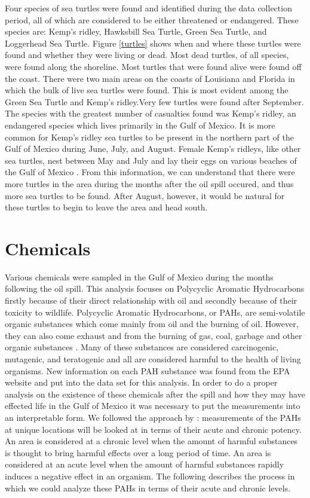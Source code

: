\documentclass[authoryear,12pt]{elsarticle}
\begin{document}
Four species of sea turtles were found and identified during the data collection period, all of which are considered to be either threatened or endangered. These species are: Kemp's ridley, Hawksbill Sea Turtle, Green Sea Turtle, and Loggerhead Sea Turtle. Figure \ref{turtles} shows when and where these turtles were found and whether they were living or dead. Most dead turtles, of all species, were found along the shoreline. Most turtles that were found alive were found off the coast. There were two main areas on the coasts of Louisiana and Florida in which the bulk of live sea turtles were found.  This is most evident among the Green Sea Turtle and Kemp's ridley.Very few turtles were found after September. The species with the greatest number of casualties found was Kemp's ridley, an endangered species which lives primarily in the Gulf of Mexico.  It is more common for Kemp's ridley sea turtles to be present in the northern part of the Gulf of Mexico during June, July, and August. Female Kemp's ridleys, like other sea turtles, nest between May and July and lay their eggs on various beaches of the Gulf of Mexico  \citet{turtles}. From this information, we can understand that there were more turtles in the area during the months after the oil spill occured, and thus more sea turtles to be found.  After August, however, it would be natural for these turtles to begin to leave the area and head south.

\section{Chemicals}


Various chemicals were sampled in the Gulf of Mexico during the months following the oil spill. This analysis focuses on Polycyclic Aromatic Hydrocarbons firstly because of their direct relationship with oil and secondly because of their toxicity to wildlife. Polycyclic Aromatic Hydrocarbons, or PAHs, are semi-volatile organic substances which come mainly from oil and the burning of oil. However, they can also come exhaust and from the burning of gas, coal, garbage and other organic substances \citep{pah}.   Many of these substances are considered carcinogenic, mutagenic, and teratogenic and all are considered harmful to the health of living organisms. New information on each PAH substance was found from the EPA website  \citep{pah} and put into the data set for this analysis. In order to do a proper analysis on the existence of these chemicals after the spill and how they may have effected life in the Gulf of Mexico it was necessary to put the measurements into an interpretable form. We followed the approach by \citet{pah-benchmark}: measurements of the PAHs at unique locations will be looked at in terms of their acute and chronic potency. An area is considered at a chronic level when the amount of harmful substances is thought to bring harmful effects over a long period of time. An area is considered at an acute level when the amount of harmful substances rapidly induces a negative effect in an organism. The following describes the process in which we could analyze these PAHs in terms of their acute and chronic levels. 
\end{document}
